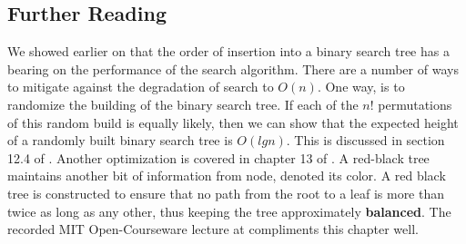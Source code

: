 \documentclass[10pt,a4paper]{article}
\begin{document}
\subsection{Further Reading}
We showed earlier on that the order of insertion into a binary search tree has a bearing on the performance of the search algorithm. There are a number of ways to mitigate against the degradation of search to $O(n)$. One way, is to randomize the building of the binary search tree. If each of the $n!$ permutations of this random build is equally likely, then we can show that the expected height of a randomly built binary search tree is $O(lg n)$. This is discussed in section 12.4 of \cite{INTROALG}. Another optimization is covered in chapter 13 of \cite{INTROALG}. A red-black tree maintains another bit of information from node, denoted its color. A red black tree is constructed to ensure that no path from the root to a leaf is more than twice as long as any other, thus keeping the tree approximately {\bf balanced}. The recorded MIT Open-Courseware lecture at \cite{REDBLACK} compliments this chapter well. 




{}

\begin{center}
\end{center}
\end{document}

